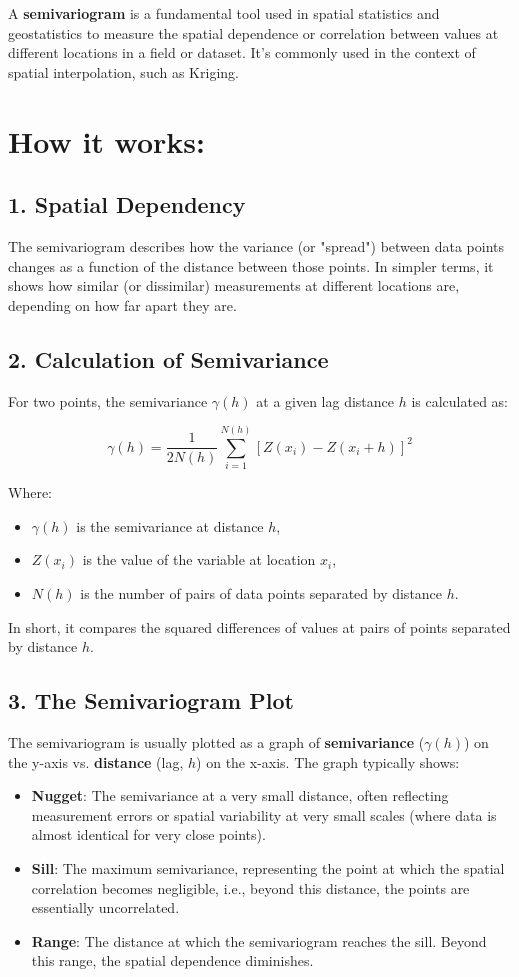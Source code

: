 \documentclass{article}
\begin{document}
	
	A \textbf{semivariogram} is a fundamental tool used in spatial statistics and geostatistics to measure the spatial dependence or correlation between values at different locations in a field or dataset. It's commonly used in the context of spatial interpolation, such as Kriging.
	
	\section*{How it works:}
	
	\subsection*{1. Spatial Dependency}
	The semivariogram describes how the variance (or "spread") between data points changes as a function of the distance between those points. In simpler terms, it shows how similar (or dissimilar) measurements at different locations are, depending on how far apart they are.
	
	\subsection*{2. Calculation of Semivariance}
	For two points, the semivariance \( \gamma(h) \) at a given lag distance \( h \) is calculated as:
	
	\[
	\gamma(h) = \frac{1}{2N(h)} \sum_{i=1}^{N(h)} [Z(x_i) - Z(x_i + h)]^2
	\]
	
	Where:
	\begin{itemize}
		\item \( \gamma(h) \) is the semivariance at distance \( h \),
		\item \( Z(x_i) \) is the value of the variable at location \( x_i \),
		\item \( N(h) \) is the number of pairs of data points separated by distance \( h \).
	\end{itemize}
	
	In short, it compares the squared differences of values at pairs of points separated by distance \( h \).
	
	\subsection*{3. The Semivariogram Plot}
	The semivariogram is usually plotted as a graph of \textbf{semivariance} (\( \gamma(h) \)) on the y-axis vs. \textbf{distance} (lag, \( h \)) on the x-axis. The graph typically shows:
	\begin{itemize}
		\item \textbf{Nugget}: The semivariance at a very small distance, often reflecting measurement errors or spatial variability at very small scales (where data is almost identical for very close points).
		\item \textbf{Sill}: The maximum semivariance, representing the point at which the spatial correlation becomes negligible, i.e., beyond this distance, the points are essentially uncorrelated.
		\item \textbf{Range}: The distance at which the semivariogram reaches the sill. Beyond this range, the spatial dependence diminishes.
	\end{itemize}
	
\end{document}
